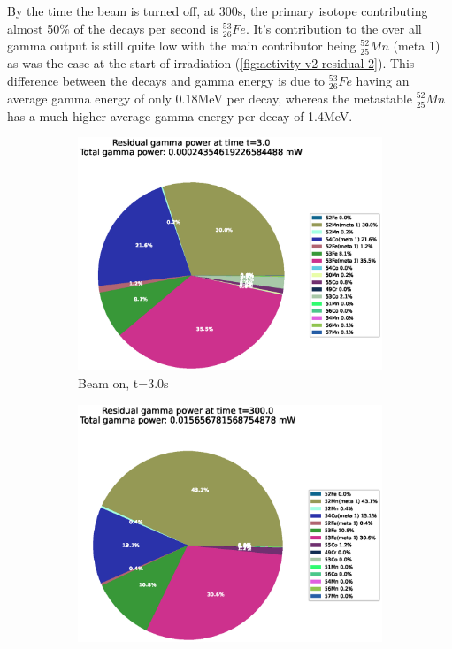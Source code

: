 By the time the beam is turned off, at 300s, the primary isotope contributing almost 50\% of the decays per second is ${}^{53}_{26}Fe$.  It's contribution to the over all gamma output is still quite low with the main contributor being ${}^{52}_{25}Mn$ (meta 1) as was the case at the start of irradiation (\ref{fig:activity-v2-residual-2}).  This difference between the decays and gamma energy is due to ${}^{53}_{26} Fe$ having an average gamma energy of only 0.18MeV per decay, whereas the metastable ${}^{52}_{25} Mn$ has a much higher average gamma energy per decay of 1.4MeV.

\begin{figure}[htb]
\centering
\begin{subfigure}{0.49\textwidth}
  \includegraphics[width=\linewidth]{chapters/activity_code/fe-activity-v2/residual-energy/0001_3.eps}
  \caption{Beam on, t=3.0s}
  \label{fig:activity-v2-residual-1}
\end{subfigure}\hfil %
\begin{subfigure}{0.49\textwidth}
  \includegraphics[width=\linewidth]{chapters/activity_code/fe-activity-v2/residual-energy/0100_300.eps}

\end{subfigure}
\end{figure}

